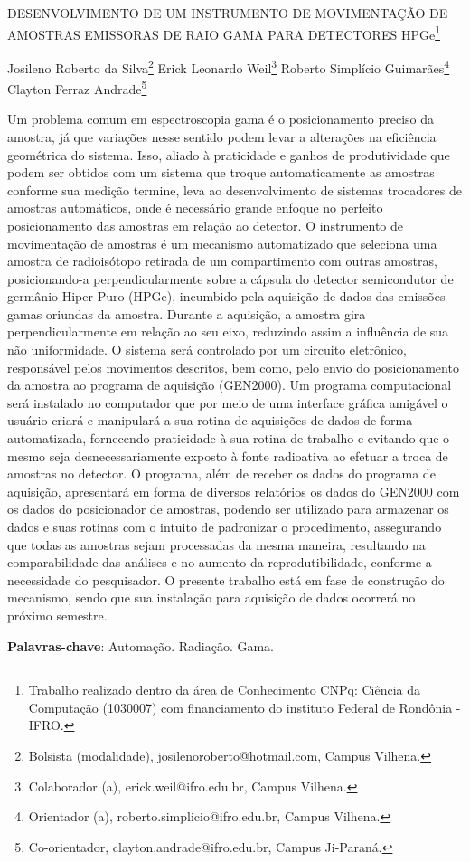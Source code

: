 \documentclass[article,12pt,onesidea,4paper,english,brazil]{abntex2}
\begin{document}
	
	
	\frenchspacing 
	
	\begin{center}
		\LARGE DESENVOLVIMENTO DE UM INSTRUMENTO DE MOVIMENTAÇÃO DE
		AMOSTRAS EMISSORAS DE RAIO GAMA PARA DETECTORES HPGe\footnote{Trabalho realizado dentro da área de Conhecimento CNPq: Ciência da Computação (1030007) com
		financiamento do instituto Federal de Rondônia - IFRO.}
		
		\normalsize
		Josileno Roberto da Silva\footnote{Bolsista (modalidade), josilenoroberto@hotmail.com, Campus Vilhena.} 
		Erick Leonardo Weil\footnote{Colaborador (a), erick.weil@ifro.edu.br, Campus Vilhena.} 
		Roberto Simplício Guimarães\footnote{Orientador (a), roberto.simplicio@ifro.edu.br, Campus Vilhena.} 
		Clayton Ferraz Andrade\footnote{Co-orientador, clayton.andrade@ifro.edu.br, Campus Ji-Paraná.} 
	\end{center}
	
	\noindent Um problema comum em espectroscopia gama é o posicionamento preciso da
	amostra, já que variações nesse sentido podem levar a alterações na eficiência
	geométrica do sistema. Isso, aliado à praticidade e ganhos de produtividade que
	podem ser obtidos com um sistema que troque automaticamente as amostras
	conforme sua medição termine, leva ao desenvolvimento de sistemas trocadores de
	amostras automáticos, onde é necessário grande enfoque no perfeito
	posicionamento das amostras em relação ao detector. O instrumento de
	movimentação de amostras é um mecanismo automatizado que seleciona uma
	amostra de radioisótopo retirada de um compartimento com outras amostras,
	posicionando-a perpendicularmente sobre a cápsula do detector semicondutor de
	germânio Hiper-Puro (HPGe), incumbido pela aquisição de dados das emissões
	gamas oriundas da amostra. Durante a aquisição, a amostra gira
	perpendicularmente em relação ao seu eixo, reduzindo assim a influência de sua
	não uniformidade. O sistema será controlado por um circuito eletrônico, responsável
	pelos movimentos descritos, bem como, pelo envio do posicionamento da amostra
	ao programa de aquisição (GEN2000). Um programa computacional será instalado
	no computador que por meio de uma interface gráfica amigável o usuário criará e
	manipulará a sua rotina de aquisições de dados de forma automatizada, fornecendo
	praticidade à sua rotina de trabalho e evitando que o mesmo seja
	desnecessariamente exposto à fonte radioativa ao efetuar a troca de amostras no
	detector. O programa, além de receber os dados do programa de aquisição,
	apresentará em forma de diversos relatórios os dados do GEN2000 com os dados
	do posicionador de amostras, podendo ser utilizado para armazenar os dados e
	suas rotinas com o intuito de padronizar o procedimento, assegurando que todas as
	amostras sejam processadas da mesma maneira, resultando na comparabilidade
	das análises e no aumento da reprodutibilidade, conforme a necessidade do
	pesquisador. O presente trabalho está em fase de construção do mecanismo, sendo
	que sua instalação para aquisição de dados ocorrerá no próximo semestre.
	
	\vspace{\onelineskip}
	
	\noindent
	\textbf{Palavras-chave}: Automação. Radiação. Gama.
	
\end{document}
